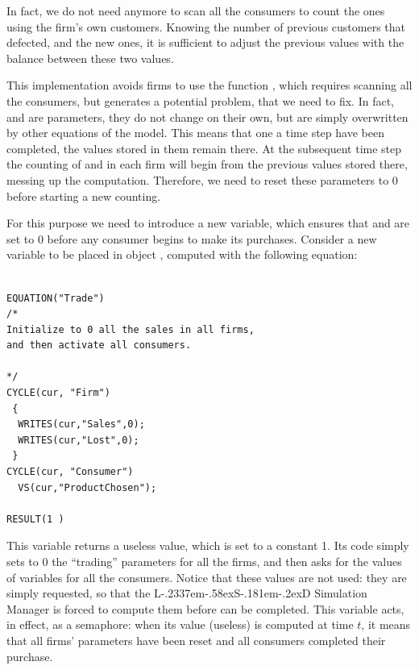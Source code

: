 \documentclass [11pt,a4paper] {book}
\def\LsD{{L\kern-.2337em\lower-.58ex\hbox{S}\kern-.181em\lower-.2ex\hbox{D}}\xspace}
\begin{document}
In fact, we do not need anymore to scan all the consumers to count the ones using the firm's own customers. Knowing the number of previous customers that defected, and the new ones, it is sufficient to adjust the previous values with the balance between these two values.

This implementation avoids firms to use the function , which requires scanning all the consumers, but generates a potential problem, that we need to fix. In fact,  and  are parameters, they do not change on their own, but are simply overwritten by other equations of the model. This means that one a time step have been completed, the values stored in them remain there. At the subsequent time step the counting of  and  in each firm will begin from the previous values stored there, messing up the computation. Therefore, we need to reset these parameters to 0 before starting a new counting.

For this purpose we need to introduce a new variable, which ensures that  and  are set to 0 before any consumer begins to make its purchases. Consider a new variable to be placed in object , computed with the following equation:


\begin{minipage}[h]{10cm}
\small
\begin{verbatim}

EQUATION("Trade")
/*
Initialize to 0 all the sales in all firms, 
and then activate all consumers.

*/
CYCLE(cur, "Firm")
 {
  WRITES(cur,"Sales",0);
  WRITES(cur,"Lost",0);
 }
CYCLE(cur, "Consumer")
  VS(cur,"ProductChosen");

RESULT(1 )

\end{verbatim}
\normalsize
\end{minipage}

This variable returns a useless value, which is set to a constant 1. Its code simply sets to 0 the ``trading'' parameters for all the firms, and then asks for the values of variables  for all the consumers. Notice that these values are not used: they are simply requested, so that the \LsD Simulation Manager is forced to compute them before  can be completed. This variable acts, in effect, as a semaphore: when its value (useless) is computed at time $t$, it means that all firms' parameters have been reset and all consumers completed their purchase.
\end{document}
